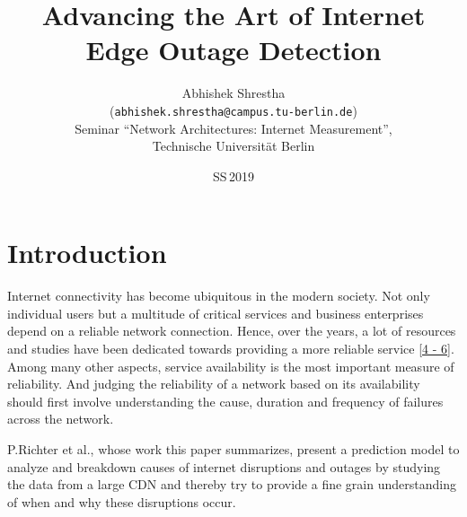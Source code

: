 \documentclass[11pt,twoside,a4paper]{article}
\begin{document}

\title{Advancing the Art of Internet Edge Outage Detection}
\author{Abhishek Shrestha \\
  (\texttt{abhishek.shrestha@campus.tu-berlin.de})\\[5mm]
 Seminar ``Network Architectures: Internet Measurement'', \\	%
 Technische Universit{\"a}t Berlin
}
  
\date{SS\,2019}

\maketitle

\section{Introduction}
Internet connectivity has become ubiquitous in the modern society. Not only individual users but a multitude of critical services and business enterprises depend on a reliable network connection. Hence, over the years, a lot of resources and studies have been dedicated towards providing a more reliable service \hyperlink {K4}{[4 - 6]}. Among many other aspects, service availability is the most important measure of reliability. And judging the reliability of a network based on its availability should first involve understanding the cause, duration and frequency of failures across the network.
  
P.Richter et al., whose work this paper summarizes, present a prediction model to analyze and breakdown causes of internet disruptions and outages by studying the data from a large CDN and thereby try to provide a fine grain understanding of when and why these disruptions occur.
\end{document}

